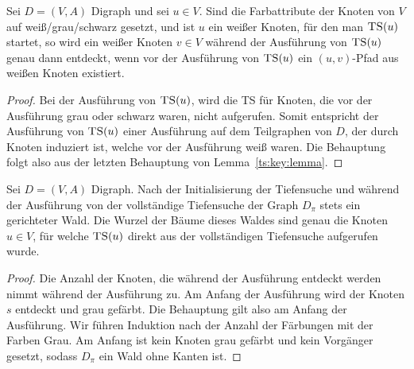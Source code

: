 \begin{kor} \label{kor:weisse:pfade} 
	Sei $D=(V,A)$ Digraph und sei $u \in V$.
	Sind die Farbattribute der Knoten von $V$ auf weiß/grau/schwarz gesetzt, und ist $u$ ein weißer Knoten, für den man $\mathop{\text{\textsc{TS}}}(u)$ startet, so wird ein weißer Knoten $v \in V$ während der Ausführung von $\mathop{\text{\textsc{TS}}}(u)$ genau dann entdeckt, wenn vor der Ausführung von $\mathop{\text{\textsc{TS}}}(u)$ ein $(u,v)$-Pfad aus weißen Knoten existiert. 
\end{kor} 
\begin{proof}
	Bei der Ausführung von $\mathop{\text{\textsc{TS}}}(u)$, wird die TS für Knoten, die vor der Ausführung grau oder schwarz waren, nicht aufgerufen. Somit entspricht der Ausführung von $\mathop{\text{\textsc{TS}}}(u)$ einer Ausführung auf dem Teilgraphen von $D$, der durch Knoten induziert ist, welche vor der Ausführung weiß waren. Die Behauptung folgt also aus der letzten Behauptung von Lemma~\ref{ts:key:lemma}. 
\end{proof} 

\begin{lem}
	Sei $D= (V,A)$ Digraph. 
	Nach der Initialisierung der Tiefensuche und während der Ausführung von der vollständige Tiefensuche der Graph $D_\pi$ stets ein gerichteter Wald. Die Wurzel der Bäume dieses Waldes sind genau die Knoten $u \in V$, für welche $\mathop{\text{\textsc{TS}}}(u)$ direkt aus der vollständigen Tiefensuche aufgerufen wurde. 
\end{lem} 
\begin{proof} 
	Die Anzahl der Knoten, die während der Ausführung entdeckt werden nimmt während der Ausführung zu. Am Anfang der Ausführung wird der Knoten $s$ entdeckt und grau gefärbt. Die Behauptung gilt also am Anfang der Ausführung. Wir führen Induktion nach der Anzahl der Färbungen mit der Farben Grau. Am Anfang ist kein Knoten grau gefärbt und kein Vorgänger gesetzt, sodass $D_\pi$ ein Wald ohne Kanten ist. 
\end{proof} 

